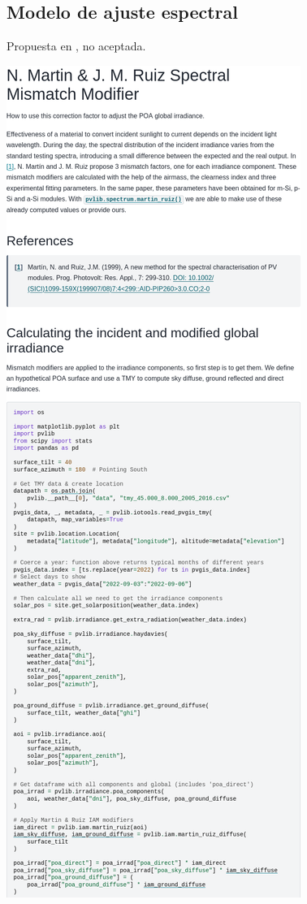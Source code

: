 \begin{myparindent}{0pt}

\newpage\section{Modelo de ajuste espectral} \label{sct:doc_ej_modelo_nuria}

Propuesta en , no aceptada.

\includegraphics[width=\linewidth,height=0.9\textheight,keepaspectratio]{images/docs_examples_cut/mr_0.png}


\end{myparindent}
